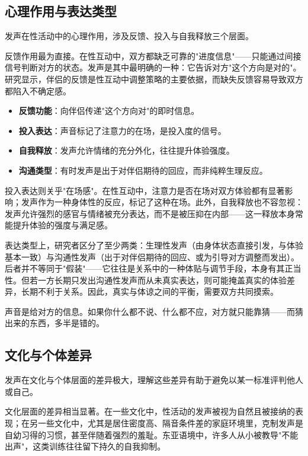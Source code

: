 \documentclass[12pt,UTF8]{ctexbook}
\newcommand{\keyword}[1]{\textbf{#1}}
\begin{document}
\subsection{心理作用与表达类型}

发声在性活动中的心理作用，涉及反馈、投入与自我释放三个层面。

反馈作用最为直接。在性互动中，双方都缺乏可靠的"进度信息"——只能通过间接信号判断对方的状态。发声是其中最明确的一种：它告诉对方"这个方向是对的"。研究显示，伴侣的反馈是性互动中调整策略的主要依据，而缺失反馈容易导致双方都陷入不确定感。

\begin{itemize}
  \item \keyword{反馈功能}：向伴侣传递"这个方向对"的即时信息。
  \item \keyword{投入表达}：声音标记了注意力的在场，是投入度的信号。
  \item \keyword{自我释放}：发声允许情绪的充分外化，往往提升体验强度。
  \item \keyword{沟通类型}：有时发声是出于对伴侣期待的回应，而非纯粹生理反应。
\end{itemize}

投入表达则关乎"在场感"。在性互动中，注意力是否在场对双方体验都有显著影响；发声作为一种身体性的反应，标记了这种在场。此外，自我释放也不容忽视：发声允许强烈的感官与情绪被充分表达，而不是被压抑在内部——这一释放本身常能提升体验的强度与满足感。

表达类型上，研究者区分了至少两类：生理性发声（由身体状态直接引发，与体验基本一致）与沟通性发声（出于对伴侣期待的回应、或为引导对方调整而发出）。后者并不等同于"假装"——它往往是关系中的一种体贴与调节手段，本身有其正当性。但若一方长期只发出沟通性发声而从未真实表达，则可能掩盖真实的体验差异，长期不利于关系。因此，真实与体谅之间的平衡，需要双方共同摸索。

\begin{tcolorbox}[colback=pink!5!white,colframe=red!50!black,title=贴心小叮咛]
声音是给对方的信息。如果你什么都不说、什么都不应，对方就只能靠猜——而猜出来的东西，多半是错的。
\end{tcolorbox}
\subsection{文化与个体差异}

发声在文化与个体层面的差异极大，理解这些差异有助于避免以某一标准评判他人或自己。

文化层面的差异相当显著。在一些文化中，性活动的发声被视为自然且被接纳的表现；在另一些文化中，尤其是居住密度高、隔音条件差的家庭环境里，克制发声是自幼习得的习惯，甚至伴随着强烈的羞耻。东亚语境中，许多人从小被教导"不能出声"，这类训练往往留下持久的自我抑制。
\end{document}
